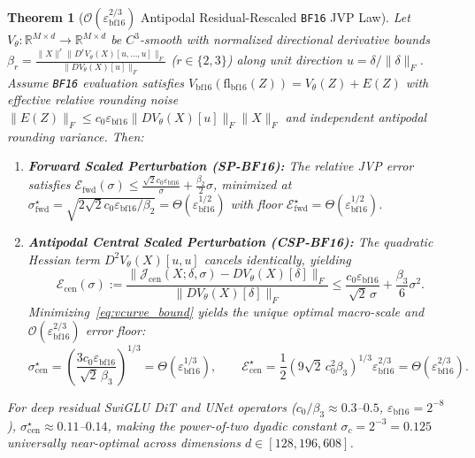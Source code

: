 \documentclass[11pt,a4paper]{article}
\newtheorem{theorem}{Theorem}
\theoremstyle{definition}
\theoremstyle{remark}
\newcommand{\bfsixteen}{\texttt{BF16}}
\newcommand{\epsbf}{\varepsilon_{\mathrm{bf16}}}
\begin{document}
\begin{theorem}[$\mathcal{O}(\epsbf^{2/3})$ Antipodal Residual-Rescaled \bfsixteen{} JVP Law]
\label{thm:vcurve}
Let $V_\theta : \mathbb{R}^{M \times d} \to \mathbb{R}^{M \times d}$ be $C^3$-smooth with normalized directional derivative bounds $\beta_r = \frac{\|X\|^r \|D^r V_\theta(X)[u,\dots,u]\|_F}{\|D V_\theta(X)[u]\|_F}$ ($r \in \{2,3\}$) along unit direction $u = \delta / \|\delta\|_F$. Assume \bfsixteen{} evaluation satisfies $V_{\mathrm{bf16}}(\mathrm{fl}_{\mathrm{bf16}}(Z)) = V_\theta(Z) + E(Z)$ with effective relative rounding noise $\|E(Z)\|_F \le c_0 \epsbf \|D V_\theta(X)[u]\|_F \|X\|_F$ and independent antipodal rounding variance. Then:
\begin{enumerate}[leftmargin=1.8em,itemsep=2pt]
    \item \textbf{Forward Scaled Perturbation (\textsc{SP-BF16}):} The relative JVP error satisfies $\mathcal{E}_{\mathrm{fwd}}(\sigma) \le \frac{\sqrt{2} c_0 \epsbf}{\sigma} + \frac{\beta_2}{2}\sigma$, minimized at $\sigma_{\mathrm{fwd}}^\star = \sqrt{2\sqrt{2} c_0 \epsbf / \beta_2} = \Theta(\epsbf^{1/2})$ with floor $\mathcal{E}_{\mathrm{fwd}}^\star = \Theta(\epsbf^{1/2})$.
    \item \textbf{Antipodal Central Scaled Perturbation (\textsc{CSP-BF16}):} The quadratic Hessian term $D^2 V_\theta(X)[u, u]$ cancels identically, yielding
    \begin{equation}
    \label{eq:vcurve_bound}
        \mathcal{E}_{\mathrm{cen}}(\sigma) := \frac{\|\mathcal{J}_{\mathrm{cen}}(X; \delta, \sigma) - D V_\theta(X)[\delta]\|_F}{\|D V_\theta(X)[\delta]\|_F} \le \frac{c_0 \epsbf}{\sqrt{2}\,\sigma} + \frac{\beta_3}{6}\sigma^2.
    \end{equation}
    Minimizing~\eqref{eq:vcurve_bound} yields the unique optimal macro-scale and $\mathcal{O}(\epsbf^{2/3})$ error floor:
    \begin{equation}
    \label{eq:opt_sigma}
        \sigma_{\mathrm{cen}}^\star = \left(\frac{3 c_0 \epsbf}{\sqrt{2}\,\beta_3}\right)^{1/3} = \Theta(\epsbf^{1/3}), \qquad
        \mathcal{E}_{\mathrm{cen}}^\star = \frac{1}{2}\left(9 \sqrt{2}\, c_0^2 \beta_3\right)^{1/3} \epsbf^{2/3} = \Theta(\epsbf^{2/3}).
    \end{equation}
\end{enumerate}
For deep residual SwiGLU DiT and UNet operators ($c_0/\beta_3 \approx 0.3$--$0.5$, $\epsbf = 2^{-8}$), $\sigma_{\mathrm{cen}}^\star \approx 0.11$--$0.14$, making the power-of-two dyadic constant $\sigma_c = 2^{-3} = 0.125$ universally near-optimal across dimensions $d \in [128, 196{,}608]$.
\end{theorem}
\end{document}
